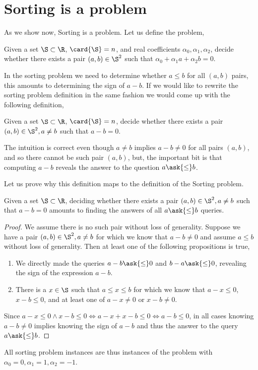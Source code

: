 \section{Sorting is a \twoLDT problem}

As we show now, Sorting is a \twoLDT problem. Let us define the
\twoLDT problem,

\begin{problem}
Given a set $\S \subset \R$, $\card{\S} = n$, and real coefficients $\alpha_0,
\alpha_1, \alpha_2$, decide whether there exists a pair $(a,b) \in \S^2$ such that
$\alpha_0 + \alpha_1 a + \alpha_2 b = 0$.
\end{problem}

In the sorting problem we need to determine whether $a \le b$ for all $(a,b)$
pairs, this amounts to determining the sign of $a-b$. If we would like to rewrite
the sorting problem definition in the same fashion we would come up with the
following definition,

\begin{problem}
Given a set $\S \subset \R$, $\card{\S} = n$, decide whether there exists a
pair $(a,b) \in \S^2, a \neq b$ such that $a - b = 0$.
\end{problem}

The intuition is correct even though $a \neq b$ implies $a-b \neq 0$ for all
pairs \((a,b)\), and so there cannot be such pair \((a,b)\), but, the important
bit is that computing $a-b$ reveals the answer to the question $a \ask{\le} b$.

Let us prove why this definition maps to the definition of the Sorting problem.

\begin{theorem}
Given a set \(\S \subset \R\), deciding whether there exists a pair \((a,b)
\in \S^2, a \neq b\) such that \(a - b = 0\) amounts to finding the answers of all \(a
\ask{\le} b\) queries.
\end{theorem}

\begin{proof}
We assume there is no such pair without loss of generality.
Suppose we have a pair \((a,b) \in \S^2, a \neq b\) for which we
know that \(a - b \neq 0\) and assume \(a \le b\) without loss of generality.
Then at least one of the following propositions is true,
\begin{enumerate}
\item We directly made the queries \(a - b
\ask{\le} 0\) and \(b - a \ask{\le} 0\), revealing the sign of the expression
\(a - b\).
\item There is a \(x \in \S\) such that \(a \le x \le b\) for which we
know that \(a - x \le 0\), \(x - b \le 0\), and at least one of \(a - x \neq
0\) or \(x - b \neq 0\).
\end{enumerate}
Since \(a - x \le 0 \land x - b \le 0 \iff a - x + x - b \le 0 \iff a - b \le
0\), in all cases knowing \(a - b \neq 0\) implies knowing the sign of \(a -
b\) and thus the answer to the query \(a \ask{\le} b\).
\end{proof}

All sorting problem instances are thus instances of the \twoLDT problem with
$\alpha_0 = 0, \alpha_1 = 1, \alpha_2 = -1$.
